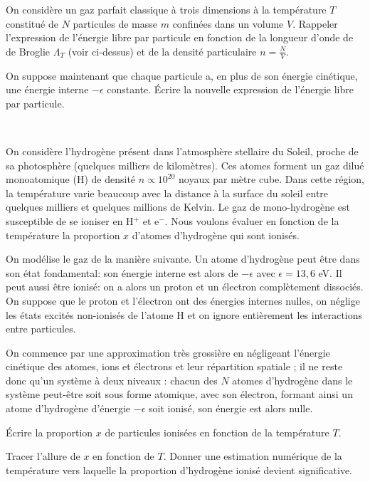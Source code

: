 \question On considère un gaz parfait classique à trois dimensions à la température $T$ constitué de $N$ particules de masse $m$ confinées dans un volume $V$. Rappeler l'expression de l'énergie libre par particule en fonction de la longueur d'onde de de Broglie $\Lambda_T$ (voir ci-dessus) et de la densité particulaire $n=\frac{N}{V}$.

\question On suppose maintenant que chaque particule a, en plus de son énergie cinétique, une énergie interne $-\epsilon$ constante. Écrire la nouvelle expression de l'énergie libre par particule.

\

On considère l’hydrogène présent dans l’atmosphère stellaire du Soleil, proche de sa photosphère (quelques milliers de kilomètres). Ces atomes forment un gaz dilué monoatomique (H) de densité $n \propto 10^{20}$ noyaux par mètre cube. Dans cette région, la température varie beaucoup avec la distance à la surface du soleil entre quelques milliers et quelques millions de Kelvin. Le gaz de mono-hydrogène est susceptible de se ioniser en H$^+$ et e$^-$. Nous voulons évaluer en fonction de la température la proportion $x$ d’atomes d’hydrogène qui sont ionisés.


On modélise le gaz de la manière suivante. Un atome d’hydrogène peut être dans son état fondamental: son énergie interne est alors de $-\epsilon$ avec $\epsilon = 13,6$ eV. Il peut aussi être ionisé: on a alors un proton et
un électron complètement dissociés. On suppose que le proton et l’électron ont des énergies internes nulles, on néglige les états excités non-ionisés de l’atome H et on ignore entièrement les interactions entre particules.


On commence par une approximation très grossière en négligeant l’énergie cinétique des atomes, ions et électrons et leur répartition spatiale ; il ne reste donc qu'un
système à deux niveaux : chacun des $N$ atomes d’hydrogène dans le système peut-être soit sous forme atomique, avec son électron, formant ainsi un atome d’hydrogène d’énergie $-\epsilon$ soit ionisé, son énergie est alors nulle.

\question Écrire la proportion $x$ de particules ionisées en fonction de la température $T$.

 \question Tracer l’allure de $x$ en fonction de $T$. Donner une estimation numérique de la température vers laquelle la proportion d'hydrogène ionisé devient significative.

